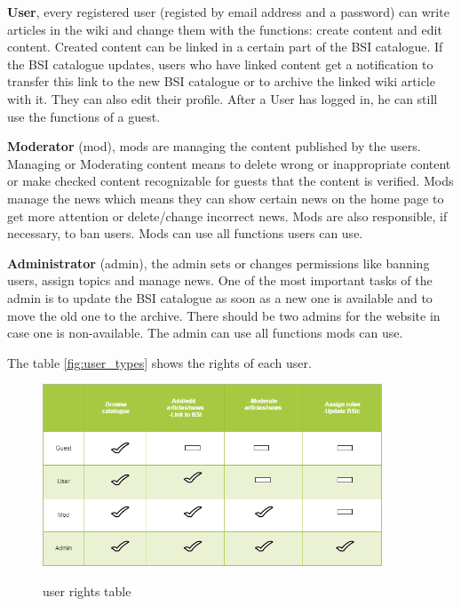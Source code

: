 \textbf{User}, every registered user (registed by email address and a password) can write articles in the wiki and change them with the functions: create content and edit content. 
Created content can be linked in a certain part of the BSI catalogue. 
If the BSI catalogue updates, users who have linked content get a notification to transfer this link to the new BSI catalogue or to archive the linked wiki article with it.
They can also edit their profile. 
After a User has logged in, he can still use the functions of a guest.
\bigskip

\textbf{Moderator} (mod), mods are managing the content published by the users.
Managing or Moderating content means to delete wrong or inappropriate content or make checked content recognizable for guests that the content is verified.  
Mods manage the news which means they can show certain news on the home page to get more attention or delete/change incorrect news. 
Mods are also responsible, if necessary, to ban users. 
Mods can use all functions users can use.
\bigskip

\textbf{Administrator} (admin), the admin sets or changes permissions like banning users, assign topics and manage news.
One of the most important tasks of the admin is to update the BSI catalogue as soon as a new one is available and to move the old one to the archive.  There should be two admins for the website in case one is non-available.
The admin can use all functions mods can use. 
\bigskip

The table \ref{fig:user_types} shows the rights of each user.

\begin{figure}[h]
    \centering
    \includegraphics[width=0.9\textwidth]{Pictures/user_types}
    \label{fig:usertypes}
    \caption{user rights table}
\end{figure}

